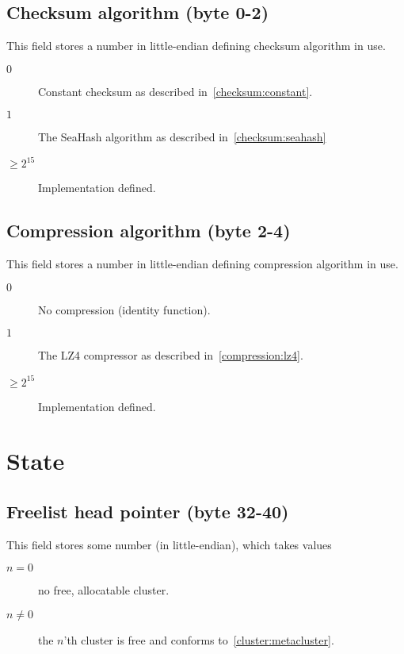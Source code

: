 \documentclass[11pt,a4paper]{report}
\begin{document}
        \subsection{Checksum algorithm (byte 0-2)}
        \label{config:checksum}
        This field stores a number in little-endian defining checksum algorithm
        in use.

        \begin{description}
            \item [$0$] Constant checksum as described
                in~\ref{checksum:constant}.
            \item [$1$] The SeaHash algorithm as described
                in~\ref{checksum:seahash}
            \item [$\geq 2^{15}$] Implementation defined.
        \end{description}

        \subsection{Compression algorithm (byte 2-4)}
        \label{config:compression}
        This field stores a number in little-endian defining compression
        algorithm in use.

        \begin{description}
            \item [$0$] No compression (identity function).
            \item [$1$] The LZ4 compressor as described
                in~\ref{compression:lz4}.
            \item [$\geq 2^{15}$] Implementation defined.
        \end{description}

    \section{State}
        \subsection{Freelist head pointer (byte 32-40)}
        This field stores some number (in little-endian), which takes values

        \begin{description}
            \item [$n = 0$]    no free, allocatable cluster.
            \item [$n \neq 0$] the $n$'th cluster is free and conforms
                to~\ref{cluster:metacluster}.
        \end{description}
\end{document}

